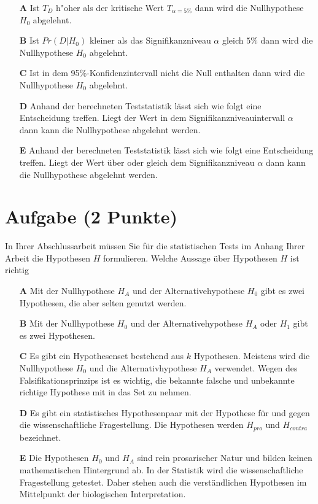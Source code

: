 \documentclass[a4paper, 9pt]{scrartcl}\usepackage[]{graphicx}\usepackage[]{xcolor}
\begin{document}
\begin{enumerate}
\item [\textbf{A} \msquare] Ist $T_{D}$ h{"o}her als der kritische Wert $T_{\alpha = 5\%}$ dann wird die Nullhypothese $H_0$ abgelehnt.
\item [\textbf{B} \msquare] Ist $Pr(D|H_0)$ kleiner als das Signifikanzniveau $\alpha$ gleich $5\%$ dann wird die Nullhypothese $H_0$ abgelehnt.
\item [\textbf{C} \msquare] Ist in dem 95\%-Konfidenzintervall nicht die Null enthalten dann wird die Nullhypothese $H_0$ abgelehnt.
\item [\textbf{D} \msquare] Anhand der berechneten Teststatistik lässt sich wie folgt eine Entscheidung treffen. Liegt der Wert in dem Signifikanzniveauintervall $\alpha$ dann kann die Nullhypothese abgelehnt werden.
\item [\textbf{E} \msquare] Anhand der berechneten Teststatistik lässt sich wie folgt eine Entscheidung treffen. Liegt der Wert über oder gleich dem Signifikanzniveau $\alpha$ dann kann die Nullhypothese abgelehnt werden.
\end{enumerate}

\section{Aufgabe \hfill (2 Punkte)}



In Ihrer Abschlussarbeit müssen Sie für die statistischen Tests im Anhang Ihrer Arbeit die Hypothesen $H$ formulieren. Welche Aussage über Hypothesen $H$ ist richtig



\begin{enumerate}
\item [\textbf{A} \msquare] Mit der Nullhypothese $H_A$ und der Alternativehypothese $H_0$ gibt es zwei Hypothesen, die aber selten genutzt werden.
\item [\textbf{B} \msquare] Mit der Nullhypothese $H_0$ und der Alternativehypothese $H_A$ oder $H_1$ gibt es zwei Hypothesen.
\item [\textbf{C} \msquare] Es gibt ein Hypothesenset bestehend aus $k$ Hypothesen. Meistens wird die Nullhypothese $H_0$ und die Alternativhypothese $H_A$ verwendet. Wegen des Falsifikationsprinzips ist es wichtig, die bekannte falsche und unbekannte richtige Hypothese mit in das Set zu nehmen.
\item [\textbf{D} \msquare] Es gibt ein statistisches Hypothesenpaar mit der Hypothese für und gegen die wissenschaftliche Fragestellung. Die Hypothesen werden $H_{pro}$ und $H_{contra}$ bezeichnet.
\item [\textbf{E} \msquare] Die Hypothesen $H_0$ und $H_A$ sind rein prosarischer Natur und bilden keinen mathematischen Hintergrund ab. In der Statistik wird die wissenschaftliche Fragestellung getestet. Daher stehen auch die verständlichen Hypothesen im Mittelpunkt der biologischen Interpretation.
\end{enumerate}
\end{document}

